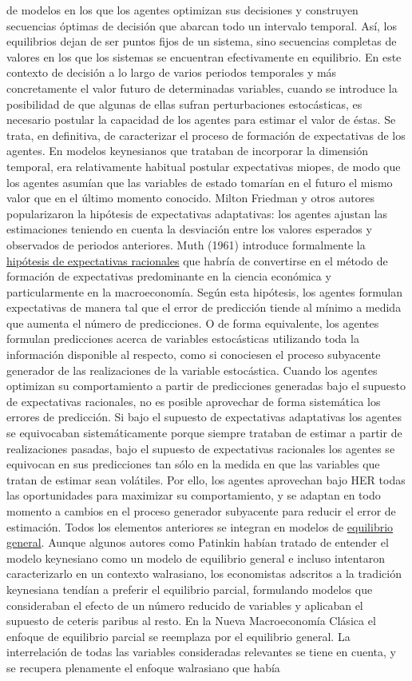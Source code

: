 \documentclass{nuevotema}
\begin{document}
de modelos en los que los agentes optimizan sus decisiones y construyen secuencias óptimas de decisión que abarcan todo un intervalo temporal. Así, los equilibrios dejan de ser puntos fijos de un sistema, sino secuencias completas de valores en los que los sistemas se encuentran efectivamente en equilibrio. En este contexto de decisión a lo largo de varios periodos temporales y más concretamente el valor futuro de determinadas variables, cuando se introduce la posibilidad de que algunas de ellas sufran perturbaciones estocásticas, es necesario postular la capacidad de los agentes para estimar el valor de éstas. Se trata, en definitiva, de caracterizar el proceso de formación de expectativas de los agentes. En modelos keynesianos que trataban de incorporar la dimensión temporal, era relativamente habitual postular expectativas miopes, de modo que los agentes asumían que las variables de estado tomarían en el futuro el mismo valor que en el último momento conocido. Milton Friedman y otros autores popularizaron la hipótesis de expectativas adaptativas: los agentes ajustan las estimaciones teniendo en cuenta la desviación entre los valores esperados y observados de periodos anteriores. Muth (1961) introduce formalmente la \underline{hipótesis de expectativas racionales} que habría de convertirse en el método de formación de expectativas predominante en la ciencia económica y particularmente en la macroeconomía. Según esta hipótesis, los agentes formulan expectativas de manera tal que el error de predicción tiende al mínimo a medida que aumenta el número de predicciones. O de forma equivalente, los agentes formulan predicciones acerca de variables estocásticas utilizando toda la información disponible al respecto, como si conociesen el proceso subyacente generador de las realizaciones de la variable estocástica. Cuando los agentes optimizan su comportamiento a partir de predicciones generadas bajo el supuesto de expectativas racionales, no es posible aprovechar de forma sistemática los errores de predicción. Si bajo el supuesto de expectativas adaptativas los agentes se equivocaban sistemáticamente porque siempre trataban de estimar a partir de realizaciones pasadas, bajo el supuesto de expectativas racionales los agentes se equivocan en sus predicciones tan sólo en la medida en que las variables que tratan de estimar sean volátiles. Por ello, los agentes aprovechan bajo HER todas las oportunidades para maximizar su comportamiento, y se adaptan en todo momento a cambios en el proceso generador subyacente para reducir el error de estimación. Todos los elementos anteriores se integran en modelos de \underline{equilibrio general}. Aunque algunos autores como Patinkin habían tratado de entender el modelo keynesiano como un modelo de equilibrio general e incluso intentaron caracterizarlo en un contexto walrasiano, los economistas adscritos a la tradición keynesiana tendían a preferir el equilibrio parcial, formulando modelos que consideraban el efecto de un número reducido de variables y aplicaban el supuesto de ceteris paribus al resto. En la Nueva Macroeconomía Clásica el enfoque de equilibrio parcial se reemplaza por el equilibrio general. La interrelación de todas las variables consideradas relevantes se tiene en cuenta, y se recupera plenamente el enfoque walrasiano que había 
\end{document}
